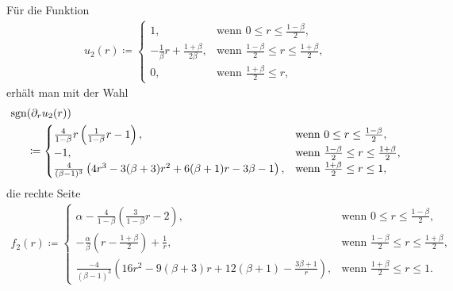 Für die Funktion
\begin{align*}
  u_2(r)\coloneqq 
  \begin{cases}
    1, & \text{wenn } 0\leq r\leq\frac{1-\beta}{2},\\
    -\frac{1}{\beta}r + \frac{1+\beta}{2\beta}, & 
    \text{wenn } \frac{1-\beta}{2}\leq r\leq \frac{1+\beta}{2},\\
    0, & \text{wenn } \frac{1+\beta}{2}\leq r,
  \end{cases}
\end{align*}
erhält man mit der Wahl
\begin{align*}
  \operatorname{sgn}&(\partial_r u_2(r)) \\
  &\coloneqq 
  \begin{cases}
    \frac{4}{1-\beta}r\left(\frac{1}{1-\beta}r -1\right), &
    \text{wenn } 0\leq r\leq\frac{1-\beta}{2},\\
    -1, & \text{wenn } \frac{1-\beta}{2}\leq r\leq \frac{1+\beta}{2},\\
    \frac{4}{(\beta-1)^3}
    \left( 4r^3-3(\beta+3)r^2 +6(\beta+1)r-3\beta-1\right), & 
    \text{wenn } \frac{1+\beta}{2}\leq r\leq 1,
  \end{cases}
\end{align*}
die rechte Seite
\begin{align*}
  f_2(r)\coloneqq 
  \begin{cases}
    \alpha - \frac{4}{1-\beta}\left(\frac{3}{1-\beta}r - 2\right), &
    \text{wenn } 0\leq r\leq\frac{1-\beta}{2},\\
    -\frac{\alpha}{\beta}\left( r-\frac{1+\beta}{2} \right) +\frac{1}{r}, & 
    \text{wenn } \frac{1-\beta}{2}\leq r\leq \frac{1+\beta}{2},\\
    \frac{-4}{(\beta-1)^3}
    \left( 16r^2 -9(\beta+3)r + 12(\beta+1) - \frac{3\beta+1}{r}\right), & 
    \text{wenn } \frac{1+\beta}{2}\leq r\leq 1.
  \end{cases}
\end{align*}

